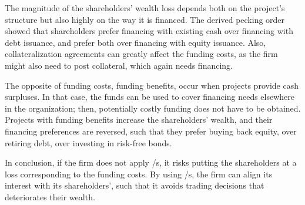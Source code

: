 \documentclass[main.tex]{subfiles}
\begin{document}
    The magnitude of the shareholders' wealth loss depends both on the project's structure
    but also highly on the way it is financed. 
    The derived pecking order showed that shareholders prefer 
    financing with existing cash over financing with debt issuance, 
    and prefer both over financing with equity issuance.
    Also, collateralization agreements can greatly affect the funding costs,
    as the firm might also need to post collateral, which again needs financing.

    The opposite of funding costs, funding benefits, occur when projects provide cash surpluses.
    In that case, the funds can be used to cover financing needs elsewhere in the organization;
    then, potentially costly funding does not have to be obtained.
    \\
    Projects with funding benefits increase the shareholders' wealth,
    and their financing preferences are reversed, 
    such that they prefer buying back equity, over retiring debt, over investing in risk-free bonds.

    In conclusion, if the firm does not apply \FVA/s, it risks putting the shareholders at a loss
    corresponding to the funding costs.
    By using \FVA/s, the firm can align its interest with its shareholders',
    such that it avoids trading decisions that deteriorates their wealth. 
\end{document}

